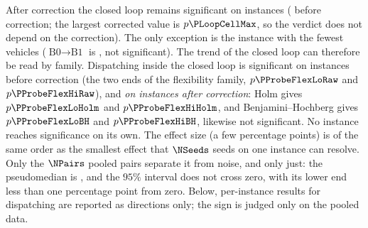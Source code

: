 After correction the closed loop remains significant on \CellsSigLoopAdj{} instances (\CellsSigLoop{} before correction; the largest corrected value is $p\PLoopCellMax$, so the verdict does not depend on the correction). The only exception is the instance with the fewest vehicles ($\text{B0}\to\text{B1}$ is \GainLoopStarve{}, not significant). The trend of the closed loop can therefore be read by family.
Dispatching inside the closed loop is significant on \CellsSigProbe{} instances before correction (the two ends of the flexibility family, $p\PProbeFlexLoRaw$ and $p\PProbeFlexHiRaw$), and \emph{on \CellsSigProbeAdj{} instances after correction}: Holm gives $p\PProbeFlexLoHolm$ and $p\PProbeFlexHiHolm$, and Benjamini--Hochberg gives $p\PProbeFlexLoBH$ and $p\PProbeFlexHiBH$, likewise not significant.
No instance reaches significance on its own. The effect size (a few percentage points) is of the same order as the smallest effect that $\NSeeds$ seeds on one instance can resolve. Only the $\NPairs$ pooled pairs separate it from noise, and only just: the pseudomedian is \HLProbeLoop{}, and the $95\%$ interval \CIProbeLoop{} does not cross zero, with its lower end less than one percentage point from zero.
Below, per-instance results for dispatching are reported as directions only; the sign is judged only on the pooled data.

\begin{table}[t]
\caption{Per-instance results of the four-level ladder and the two effects, closed loop and dispatching, blocked by the three families (each instance has $n=\NSeeds$ comparisons paired by seed).
Significance marks follow the \textbf{Holm-corrected} $p$ (two-sided Wilcoxon signed-rank test), the family being the
$\NCases$ instances of one effect: $^{*}p<0.05$, $^{**}p<0.01$; $^{\dagger}$ means significant before correction but not after, and the sign of that instance is not taken as a conclusion.
A negative value means a lower makespan. The two gain columns use the same estimator as Table~\ref{tab:main} (the mean of pairwise relative gains over seeds) and cannot be obtained by dividing the two means in the same row.
\texttt{A funnel} is at once $N_A/N_M=1.5$ of Family~B and $F=0.6$ of Family~C; it is run only once and occupies only one row.}
\label{tab:bytag}
\small

\end{table}

